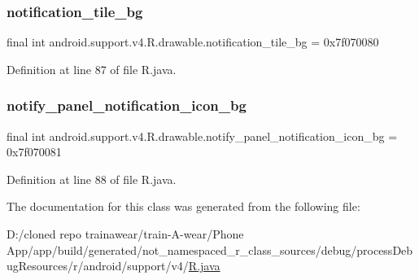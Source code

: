 \subsubsection{\texorpdfstring{notification\_tile\_bg}{notification\_tile\_bg}}
{\footnotesize\ttfamily final int android.\+support.\+v4.\+R.\+drawable.\+notification\+\_\+tile\+\_\+bg = 0x7f070080\hspace{0.3cm}{\ttfamily [static]}}



Definition at line 87 of file R.\+java.

\mbox{\label{classandroid_1_1support_1_1v4_1_1_r_1_1drawable_a6ec51c56e3b56f429d97dde6d2b6ebaa}} 
\subsubsection{\texorpdfstring{notify\_panel\_notification\_icon\_bg}{notify\_panel\_notification\_icon\_bg}}
{\footnotesize\ttfamily final int android.\+support.\+v4.\+R.\+drawable.\+notify\+\_\+panel\+\_\+notification\+\_\+icon\+\_\+bg = 0x7f070081\hspace{0.3cm}{\ttfamily [static]}}



Definition at line 88 of file R.\+java.



The documentation for this class was generated from the following file\+:\begin{DoxyCompactItemize}
\item 
D\+:/cloned repo trainawear/train-\/\+A-\/wear/\+Phone App/app/build/generated/not\+\_\+namespaced\+\_\+r\+\_\+class\+\_\+sources/debug/process\+Debug\+Resources/r/android/support/v4/\mbox{\hyperlink{process_debug_resources_2r_2android_2support_2v4_2_r_8java}{R.\+java}}\end{DoxyCompactItemize}
